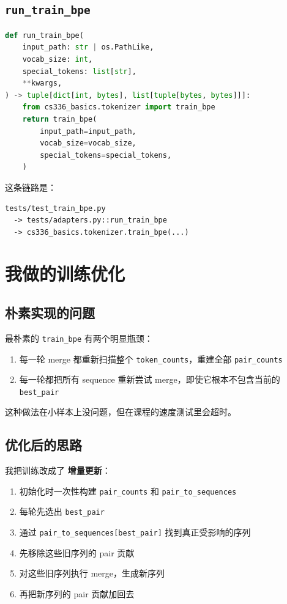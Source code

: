 \documentclass[11pt,a4paper]{ctexart}
\begin{document}
\subsection{\texttt{run\_train\_bpe}}
\begin{lstlisting}[language=Python]
def run_train_bpe(
    input_path: str | os.PathLike,
    vocab_size: int,
    special_tokens: list[str],
    **kwargs,
) -> tuple[dict[int, bytes], list[tuple[bytes, bytes]]]:
    from cs336_basics.tokenizer import train_bpe
    return train_bpe(
        input_path=input_path,
        vocab_size=vocab_size,
        special_tokens=special_tokens,
    )
\end{lstlisting}

这条链路是：
\begin{lstlisting}
tests/test_train_bpe.py
  -> tests/adapters.py::run_train_bpe
  -> cs336_basics.tokenizer.train_bpe(...)
\end{lstlisting}

\section{我做的训练优化}
\subsection{朴素实现的问题}
最朴素的 \texttt{train\_bpe} 有两个明显瓶颈：
\begin{enumerate}[leftmargin=2em]
  \item 每一轮 merge 都重新扫描整个 \texttt{token\_counts}，重建全部 \texttt{pair\_counts}
  \item 每一轮都把所有 sequence 重新尝试 merge，即使它根本不包含当前的 \texttt{best\_pair}
\end{enumerate}

这种做法在小样本上没问题，但在课程的速度测试里会超时。

\subsection{优化后的思路}
我把训练改成了 \textbf{增量更新}：
\begin{enumerate}[leftmargin=2em]
  \item 初始化时一次性构建 \texttt{pair\_counts} 和 \texttt{pair\_to\_sequences}
  \item 每轮先选出 \texttt{best\_pair}
  \item 通过 \texttt{pair\_to\_sequences[best\_pair]} 找到真正受影响的序列
  \item 先移除这些旧序列的 pair 贡献
  \item 对这些旧序列执行 merge，生成新序列
  \item 再把新序列的 pair 贡献加回去
\end{enumerate}
\end{document}
